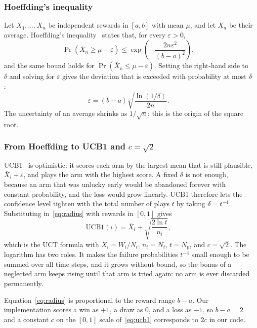 \subsubsection{Hoeffding's inequality}
Let $X_1,\dots,X_n$ be independent rewards in $[a,b]$ with mean $\mu$, and let $\bar{X}_n$ be their average. Hoeffding's inequality~\cite{hoeffding1963probability} states that, for every $\varepsilon > 0$,
\begin{equation}
\Pr\left(\bar{X}_n \ge \mu + \varepsilon\right) \le \exp\left(-\frac{2n\varepsilon^2}{(b-a)^2}\right),
\label{eq:hoeffding}
\end{equation}
and the same bound holds for $\Pr(\bar{X}_n \le \mu - \varepsilon)$. Setting the right-hand side to $\delta$ and solving for $\varepsilon$ gives the deviation that is exceeded with probability at most $\delta$:
\begin{equation}
\varepsilon = (b-a)\sqrt{\frac{\ln(1/\delta)}{2n}}.
\label{eq:radius}
\end{equation}
The uncertainty of an average shrinks as $1/\sqrt{n}$; this is the origin of the square root.

\subsubsection{From Hoeffding to UCB1 and $c=\sqrt{2}$}
UCB1~\cite{auer2002finite} is optimistic: it scores each arm by the largest mean that is still plausible, $\bar{X}_i + \varepsilon$, and plays the arm with the highest score. A fixed $\delta$ is not enough, because an arm that was unlucky early would be abandoned forever with constant probability, and the loss would grow linearly. UCB1 therefore lets the confidence level tighten with the total number of plays $t$ by taking $\delta = t^{-4}$. Substituting in~\eqref{eq:radius} with rewards in $[0,1]$ gives
\begin{equation}
\mathrm{UCB1}(i) = \bar{X}_i + \sqrt{\frac{2\ln t}{n_i}},
\label{eq:ucb1}
\end{equation}
which is the UCT formula with $\bar{X}_i = W_i/N_i$, $n_i = N_i$, $t = N_p$, and $c = \sqrt{2}$. The logarithm has two roles. It makes the failure probabilities $t^{-4}$ small enough to be summed over all time steps, and it grows without bound, so the bonus of a neglected arm keeps rising until that arm is tried again: no arm is ever discarded permanently.

Equation~\eqref{eq:radius} is proportional to the reward range $b-a$. Our implementation scores a win as $+1$, a draw as $0$, and a loss as $-1$, so $b-a = 2$ and a constant $c$ on the $[0,1]$ scale of~\eqref{eq:ucb1} corresponds to $2c$ in our code.

